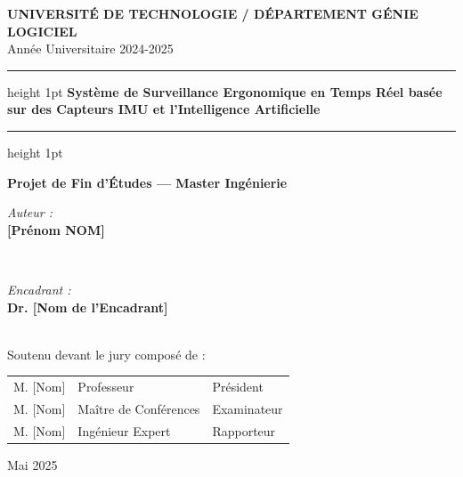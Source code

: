 \documentclass[12pt,a4paper]{report}
\begin{document}
\begin{titlepage}
    \centering
    {\large \textbf{UNIVERSITÉ DE TECHNOLOGIE / DÉPARTEMENT GÉNIE LOGICIEL}}\\[0.5cm]
    {\large Année Universitaire 2024-2025}\\[2cm]
    
    \hrule height 1pt \relax \vspace{0.4cm}
    {\huge \textbf{Système de Surveillance Ergonomique en Temps Réel basée sur des Capteurs IMU et l'Intelligence Artificielle}}\\[0.4cm]
    \hrule height 1pt \relax \vspace{1.5cm}
    
    {\Large \textbf{Projet de Fin d'Études — Master Ingénierie}}\\[2cm]
    
    \begin{minipage}{0.4\textwidth}
        \begin{flushleft} \large
            \emph{Auteur :}\\
            \textbf{[Prénom NOM]}
        \end{flushleft}
    \end{minipage}
    ~
    \begin{minipage}{0.4\textwidth}
        \begin{flushright} \large
            \emph{Encadrant :}\\
            \textbf{Dr. [Nom de l'Encadrant]}
        \end{flushright}
    \end{minipage}\\[3cm]
    
    {\large Soutenu devant le jury composé de :}\\[0.5cm]
    \begin{tabular}{lll}
        M. [Nom] & Professeur & Président \\
        M. [Nom] & Maître de Conférences & Examinateur \\
        M. [Nom] & Ingénieur Expert & Rapporteur \\
    \end{tabular}
    
    \vfill
    {\large Mai 2025}
\end{titlepage}

\end{document}
